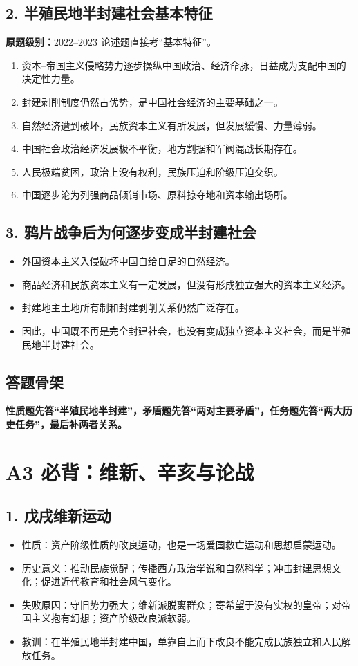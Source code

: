 \documentclass[UTF8,zihao=-4]{ctexart}
\newcommand{\tagline}[2]{%
  \vspace{0.4em}
  \noindent
  \begingroup
  \setlength{\fboxsep}{7pt}
  \colorbox{soft}{%
    \parbox{\dimexpr\linewidth-14pt\relax}{%
      {\bfseries\textcolor{#1}{#2}}%
    }%
  }%
  \endgroup
  \vspace{0.25em}
}
\newcommand{\exam}[1]{\textcolor{accent}{\bfseries 原题级别：}#1}
\begin{document}
\subsection{2. 半殖民地半封建社会基本特征}
\exam{2022--2023 论述题直接考“基本特征”。}
\begin{enumerate}
  \item 资本--帝国主义侵略势力逐步操纵中国政治、经济命脉，日益成为支配中国的决定性力量。
  \item 封建剥削制度仍然占优势，是中国社会经济的主要基础之一。
  \item 自然经济遭到破坏，民族资本主义有所发展，但发展缓慢、力量薄弱。
  \item 中国社会政治经济发展极不平衡，地方割据和军阀混战长期存在。
  \item 人民极端贫困，政治上没有权利，民族压迫和阶级压迫交织。
  \item 中国逐步沦为列强商品倾销市场、原料掠夺地和资本输出场所。
\end{enumerate}

\subsection{3. 鸦片战争后为何逐步变成半封建社会}
\begin{itemize}
  \item 外国资本主义入侵破坏中国自给自足的自然经济。
  \item 商品经济和民族资本主义有一定发展，但没有形成独立强大的资本主义经济。
  \item 封建地主土地所有制和封建剥削关系仍然广泛存在。
  \item 因此，中国既不再是完全封建社会，也没有变成独立资本主义社会，而是半殖民地半封建社会。
\end{itemize}

\subsection{答题骨架}
\tagline{main}{性质题先答“半殖民地半封建”，矛盾题先答“两对主要矛盾”，任务题先答“两大历史任务”，最后补两者关系。}

\newpage

\section{A3 必背：维新、辛亥与论战}

\subsection{1. 戊戌维新运动}
\begin{itemize}
  \item 性质：资产阶级性质的改良运动，也是一场爱国救亡运动和思想启蒙运动。
  \item 历史意义：推动民族觉醒；传播西方政治学说和自然科学；冲击封建思想文化；促进近代教育和社会风气变化。
  \item 失败原因：守旧势力强大；维新派脱离群众；寄希望于没有实权的皇帝；对帝国主义抱有幻想；资产阶级改良派软弱。
  \item 教训：在半殖民地半封建中国，单靠自上而下改良不能完成民族独立和人民解放任务。
\end{itemize}
\end{document}
